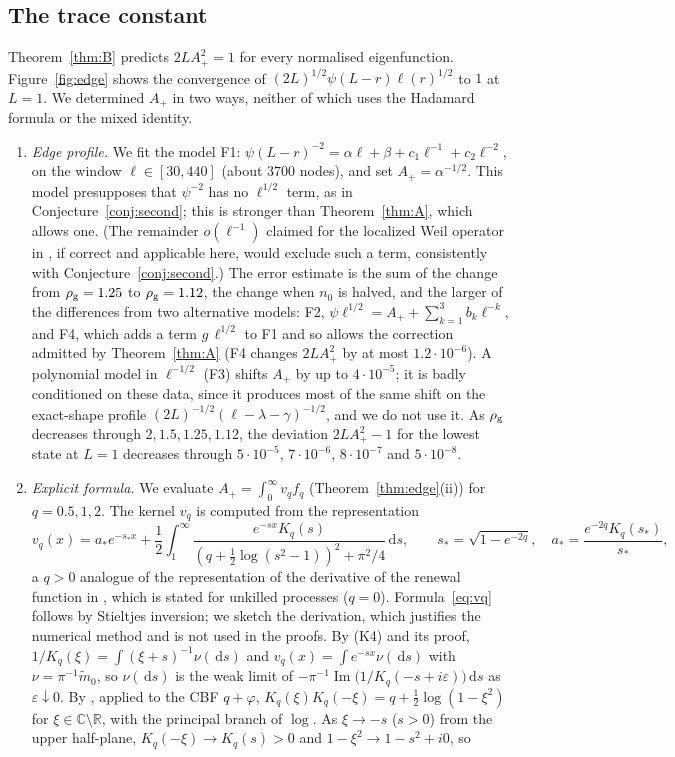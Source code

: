 \documentclass[11pt]{amsart}
\newcommand{\R}{\mathbb{R}}
\newcommand{\C}{\mathbb{C}}
\newcommand{\eps}{\varepsilon}
\newcommand{\dd}{\,\mathrm{d}}
\newcommand{\e}[1]{\cdot 10^{#1}}
\DeclareMathOperator{\im}{Im}
\theoremstyle{definition}
\theoremstyle{remark}
\numberwithin{equation}{section}
\begin{document}
\subsection*{The trace constant}
Theorem~\ref{thm:B} predicts $2LA_+^2=1$ for every normalised eigenfunction. Figure~\ref{fig:edge} shows the convergence of $(2L)^{1/2}\psi(L-r)\ell(r)^{1/2}$ to $1$ at $L=1$. We determined $A_+$ in two ways, neither of which uses the Hadamard formula or the mixed identity.
\begin{enumerate}
\item \emph{Edge profile.} We fit the model F1: $\psi(L-r)^{-2}=\alpha\ell+\beta+c_1\ell^{-1}+c_2\ell^{-2}$, on the window $\ell\in[30,440]$ (about $3700$ nodes), and set $A_+=\alpha^{-1/2}$. This model presupposes that $\psi^{-2}$ has no $\ell^{1/2}$ term, as in Conjecture~\ref{conj:second}; this is stronger than Theorem~\ref{thm:A}, which allows one. (The remainder $o(\ell^{-1})$ claimed for the localized Weil operator in \cite[PL-323]{Mathia26}, if correct and applicable here, would exclude such a term, consistently with Conjecture~\ref{conj:second}.) The error estimate is the sum of the change from $\rho_{\rm g}=1.25$ to $\rho_{\rm g}=1.12$, the change when $n_0$ is halved, and the larger of the differences from two alternative models: F2, $\psi\ell^{1/2}=A_++\sum_{k=1}^3b_k\ell^{-k}$, and F4, which adds a term $g\,\ell^{1/2}$ to F1 and so allows the correction admitted by Theorem~\ref{thm:A} (F4 changes $2LA_+^2$ by at most $1.2\e{-6}$). A polynomial model in $\ell^{-1/2}$ (F3) shifts $A_+$ by up to $4\e{-5}$; it is badly conditioned on these data, since it produces most of the same shift on the exact-shape profile $(2L)^{-1/2}(\ell-\lambda-\gamma)^{-1/2}$, and we do not use it. As $\rho_{\rm g}$ decreases through $2,1.5,1.25,1.12$, the deviation $2LA_+^2-1$ for the lowest state at $L=1$ decreases through $5\e{-5}$, $7\e{-6}$, $8\e{-7}$ and $5\e{-8}$.
\item \emph{Explicit formula.} We evaluate $A_+=\int_0^\infty v_qf_q$ (Theorem~\ref{thm:edge}(ii)) for $q=0.5,1,2$. The kernel $v_q$ is computed from the representation
\begin{equation}\label{eq:vq}
v_q(x)=a_*e^{-s_*x}+\frac12\int_1^\infty\frac{e^{-sx}K_q(s)}{(q+\frac12\log(s^2-1))^2+\pi^2/4}\dd s,\qquad s_*=\sqrt{1-e^{-2q}},\quad a_*=\frac{e^{-2q}K_q(s_*)}{s_*},
\end{equation}
a $q>0$ analogue of the representation of the derivative of the renewal function in \cite[Prop.~4.5, (4.6)]{KMR13}, which is stated for unkilled processes ($q=0$). Formula~\eqref{eq:vq} follows by Stieltjes inversion; we sketch the derivation, which justifies the numerical method and is not used in the proofs. By (K4) and its proof, $1/K_q(\xi)=\int(\xi+s)^{-1}\nu(\dd s)$ and $v_q(x)=\int e^{-sx}\nu(\dd s)$ with $\nu=\pi^{-1}\tilde m_0$, so $\nu(\dd s)$ is the weak limit of $-\pi^{-1}\im\bigl(1/K_q(-s+i\eps)\bigr)\dd s$ as $\eps\downarrow0$. By \cite[Lemma~3.8, (3.4)]{Kw11}, applied to the CBF $q+\varphi$, $K_q(\xi)K_q(-\xi)=q+\frac12\log(1-\xi^2)$ for $\xi\in\C\setminus\R$, with the principal branch of $\log$. As $\xi\to-s$ ($s>0$) from the upper half-plane, $K_q(-\xi)\to K_q(s)>0$ and $1-\xi^2\to1-s^2+i0$, so

\end{enumerate}
\end{document}
